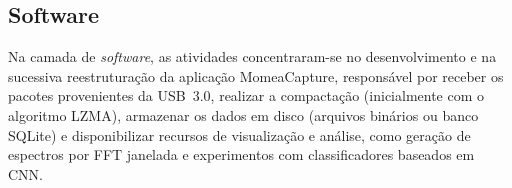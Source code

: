 %
%

\subsection{Software}
Na camada de \textit{software}, as atividades concentraram-se no desenvolvimento e na sucessiva reestruturação da aplicação MomeaCapture, responsável por receber os pacotes provenientes da USB~3.0, realizar a compactação (inicialmente com o algoritmo LZMA), armazenar os dados em disco (arquivos binários ou banco SQLite) e disponibilizar recursos de visualização e análise, como geração de espectros por FFT janelada e experimentos com classificadores baseados em CNN. 

